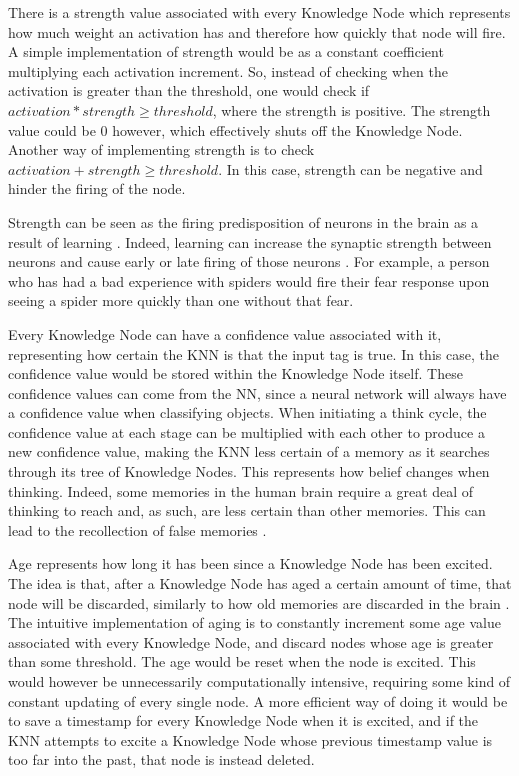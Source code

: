 \documentclass[titlepage,11pt]{article}
\begin{document}

There is a strength value associated with every Knowledge Node which represents how much weight an activation has and therefore how quickly that node will fire. A simple implementation of strength would be as a constant coefficient multiplying each activation increment. So, instead of checking when the activation is greater than the threshold, one would check if $activation * strength \geq threshold$, where the strength is positive. The strength value could be 0 however, which effectively shuts off the Knowledge Node. Another way of implementing strength is to check $activation + strength \geq threshold$. In this case, strength can be negative and hinder the firing of the node.

Strength can be seen as the firing predisposition of neurons in the brain as a result of learning \cite{vybihal-knowledge}. Indeed, learning can increase the synaptic strength between neurons and cause early or late firing of those neurons \cite{hebb}. For example, a person who has had a bad experience with spiders would fire their fear response upon seeing a spider more quickly than one without that fear.

Every Knowledge Node can have a confidence value associated with it, representing how certain the KNN is that the input tag is true. In this case, the confidence value would be stored within the Knowledge Node itself. These confidence values can come from the NN, since a neural network will always have a confidence value when classifying objects. When initiating a think cycle, the confidence value at each stage can be multiplied with each other to produce a new confidence value, making the KNN less certain of a memory as it searches through its tree of Knowledge Nodes. This represents how belief changes when thinking. Indeed, some memories in the human brain require a great deal of thinking to reach and, as such, are less certain than other memories. This can lead to the recollection of false memories \cite{falsememories}.

Age represents how long it has been since a Knowledge Node has been excited. The idea is that, after a Knowledge Node has aged a certain amount of time, that node will be discarded, similarly to how old memories are discarded in the brain \cite{aging}. The intuitive implementation of aging is to constantly increment some age value associated with every Knowledge Node, and discard nodes whose age is greater than some threshold. The age would be reset when the node is excited. This would however be unnecessarily computationally intensive, requiring some kind of constant updating of every single node. A more efficient way of doing it would be to save a timestamp for every Knowledge Node when it is excited, and if the KNN attempts to excite a Knowledge Node whose previous timestamp value is too far into the past, that node is instead deleted.
\end{document}
